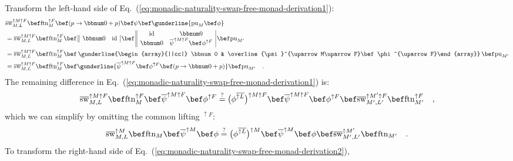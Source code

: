 Transform the left-hand side of Eq.~(\ref{eq:monadic-naturality-swap-free-monad-derivation1}):
\begin{align*}
 & \overline{\text{sw}}_{M,L}^{\uparrow M\uparrow F}\bef\text{ftn}_{M}^{\uparrow F}\bef(p\rightarrow\bbnum 0+p)\bef\psi\bef\gunderline{\text{pu}_{M}\bef\phi}\\
 & =\overline{\text{sw}}_{M,L}^{\uparrow M\uparrow F}\bef\text{ftn}_{M}^{\uparrow F}\bef\,\begin{array}{||cc|}
\bbnum 0 & \text{id}\end{array}\,\bef\,\begin{array}{||cc|}
\text{id} & \bbnum 0\\
\bbnum 0 & \overline{\psi}^{\uparrow M\uparrow F}\bef\phi^{\uparrow F}
\end{array}\,\bef\text{pu}_{M^{\prime}}\\
 & =\overline{\text{sw}}_{M,L}^{\uparrow M\uparrow F}\bef\text{ftn}_{M}^{\uparrow F}\bef\,\gunderline{\begin{array}{||cc|}
\bbnum 0 & \overline{\psi}^{\uparrow M\uparrow F}\bef\phi^{\uparrow F}\end{array}}\,\bef\text{pu}_{M^{\prime}}\\
 & =\overline{\text{sw}}_{M,L}^{\uparrow M\uparrow F}\bef\text{ftn}_{M}^{\uparrow F}\bef\gunderline{\overline{\psi}^{\uparrow M\uparrow F}\bef\phi^{\uparrow F}\bef(p\rightarrow\bbnum 0+p)}\bef\text{pu}_{M^{\prime}}\quad.
\end{align*}
The remaining difference in Eq.~(\ref{eq:monadic-naturality-swap-free-monad-derivation1})
is:
\[
\overline{\text{sw}}_{M,L}^{\uparrow M\uparrow F}\bef\text{ftn}_{M}^{\uparrow F}\bef\overline{\psi}^{\uparrow M\uparrow F}\bef\phi^{\uparrow F}\overset{?}{=}\big(\phi^{\overline{\uparrow L}}\big)^{\uparrow M\uparrow F}\bef\overline{\psi}^{\uparrow M\uparrow F}\bef\phi^{\uparrow F}\bef\overline{\text{sw}}_{M^{\prime},L^{\prime}}^{\uparrow M^{\prime}\uparrow F}\bef\text{ftn}_{M^{\prime}}^{\uparrow F}\quad,
\]
which we can simplify by omitting the common lifting $^{\uparrow F}$:
\begin{equation}
\overline{\text{sw}}_{M,L}^{\uparrow M}\bef\text{ftn}_{M}\bef\overline{\psi}^{\uparrow M}\bef\phi\overset{?}{=}\big(\phi^{\overline{\uparrow L}}\big)^{\uparrow M}\bef\overline{\psi}^{\uparrow M}\bef\phi\bef\overline{\text{sw}}_{M^{\prime},L^{\prime}}^{\uparrow M^{\prime}}\bef\text{ftn}_{M^{\prime}}\quad.\label{eq:monadic-naturality-swap-free-monad-derivation2}
\end{equation}
To transform the right-hand side of Eq.~(\ref{eq:monadic-naturality-swap-free-monad-derivation2}),
